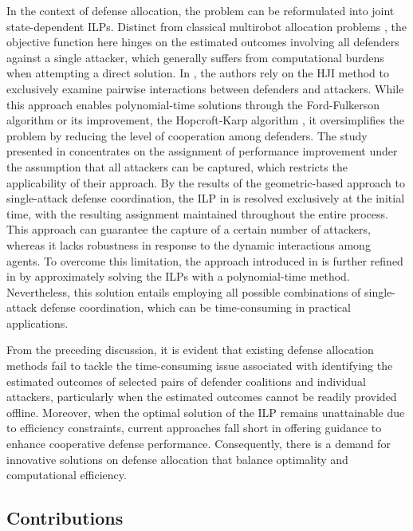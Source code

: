 \documentclass[journal]{IEEEtran}
\newcommand{\1}{\mathbf{1}}
\begin{document}
In the context of defense allocation, the problem can be reformulated into joint state-dependent ILPs. Distinct from classical multirobot allocation problems \cite{gerkey2004formal,korsah2013comprehensive}, the objective function here hinges on the estimated outcomes involving all defenders against a single attacker, which generally suffers from computational burdens when attempting a direct solution. In \cite{chen2016multiplayer}, the authors rely on the HJI method to exclusively examine pairwise interactions between defenders and attackers. While this approach enables polynomial-time solutions through the Ford-Fulkerson algorithm \cite{ford1956maximal} or its improvement, the Hopcroft-Karp algorithm \cite{hopcroft1973n}, it oversimplifies the problem by reducing the level of cooperation among defenders. The study presented in \cite{garcia2020multiple} concentrates on the assignment of performance improvement under the assumption that all attackers can be captured, which restricts the applicability of their approach. By the results of the geometric-based approach to single-attack defense coordination, the ILP in \cite{yan2019task} is resolved exclusively at the initial time, with the resulting assignment maintained throughout the entire process. This approach can guarantee the capture of a certain number of attackers, whereas it lacks robustness in response to the dynamic interactions among agents. To overcome this limitation, the approach introduced in \cite{yan2019task} is further refined in \cite{yan2022matching} by approximately solving the ILPs with a polynomial-time method. Nevertheless, this solution entails employing all possible combinations of single-attack defense coordination, which can be time-consuming in practical applications.

From the preceding discussion, it is evident that existing defense allocation methods fail to tackle the time-consuming issue associated with identifying the estimated outcomes of selected pairs of defender coalitions and individual attackers, particularly when the estimated outcomes cannot be readily provided offline. Moreover, when the optimal solution of the ILP remains unattainable due to efficiency constraints, current approaches fall short in offering guidance to enhance cooperative defense performance. Consequently, there is a demand for innovative solutions on defense allocation that balance optimality and computational efficiency.

\subsection{Contributions}
\end{document}
